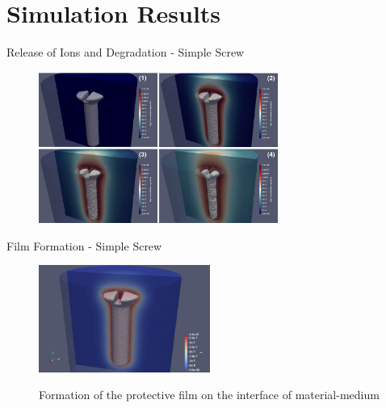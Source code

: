 \documentclass[11pt,t]{beamer}
\begin{document}
\section{Simulation Results}

\begin{frame}[fragile]{Release of Ions and Degradation - Simple Screw}

		\begin{figure}
			\centering
			\includegraphics[width=0.7\textwidth] {screw_result}
			
		\end{figure}

\end{frame}


\begin{frame}[fragile]{Film Formation - Simple Screw}

		\begin{figure}
			\centering
			\includegraphics[width=0.5\textwidth] {screw_film}
			
			\footnotesize Formation of the protective film on the interface of material-medium
			
		\end{figure}

\end{frame}
\end{document}
